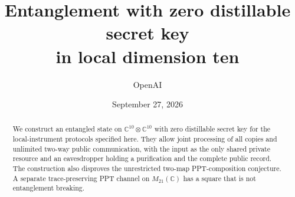 \documentclass[11pt]{article}
\title{Entanglement with zero distillable secret key\\
in local dimension ten}
\author{OpenAI}
\date{September 27, 2026}
\numberwithin{equation}{section}
\theoremstyle{definition}
\theoremstyle{remark}
\newcommand{\Mat}[1]{M_{#1}(\mathbb C)}
\newcommand{\C}{\mathbb C}
\begin{document}
\maketitle

\begin{abstract}
We construct an entangled state on $\C^{10}\otimes\C^{10}$ with zero
distillable secret key for the local-instrument protocols specified here.
They allow joint processing of all copies and unlimited two-way public
communication, with the input as the only shared private resource and an
eavesdropper holding a purification and the complete public record.
The construction also disproves the unrestricted two-map PPT-composition
conjecture. A separate trace-preserving PPT channel on $\Mat{21}$ has a
square that is not entanglement breaking.
\end{abstract}












\appendix



\end{document}
